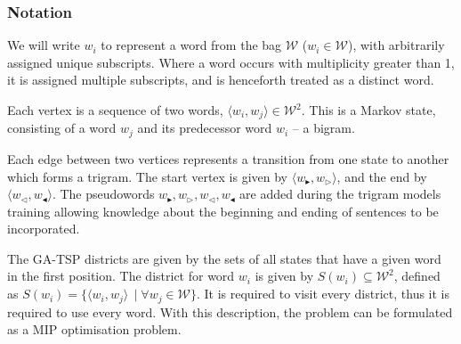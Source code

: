 \documentclass[twocolumn]{article}
\begin{document}
\renewcommand{\s}{w_{\blacktriangleright}}
\renewcommand{\ss}{w_{\triangleright}}
\newcommand{\e}{w_{\triangleleft}}
\newcommand{\ee}{w_{\blacktriangleleft}}
\newcommand{\W}{\mathcal{W}}

\newcommand{\displayunskip}{\vspace{0pt}} %

\subsubsection{Notation}
We will write $w_{i}$ to represent a word from the bag \textbf{$\W$} ($w_i\in \W$), with
arbitrarily assigned unique subscripts. Where a word occurs with multiplicity
greater than 1, it is assigned multiple subscripts, and is henceforth treated as a distinct word.

Each vertex is a sequence of two words, $\langle w_{i},w_{j}\rangle\in\W^{2}$.
This is a Markov state, consisting of a word $w_j$ and its predecessor word $w_i$ -- a bigram.

Each edge between two vertices represents a transition from one state to another which forms a trigram.
The start vertex is given by $\langle\s,\ss\rangle$, and the end by $\langle\e,\ee\rangle$. The pseudowords  $\s,\ss,\e,\ee$ are added during the trigram models training allowing knowledge about the beginning and ending of sentences to be incorporated.

The GA-TSP districts are given by the sets of all states that have
a given word in the first position. The district for word $w_{i}$
is given by $S(w_{i})\subseteq\W^{2}$, defined as $S(w_{i})=\{\langle w_{i},w_{j}\rangle\,\mid \forall w_{j}\in\W\}$. It is required to visit every district, thus it is required to use every word.
With this description, the problem can be formulated as a MIP optimisation problem.
\end{document}
